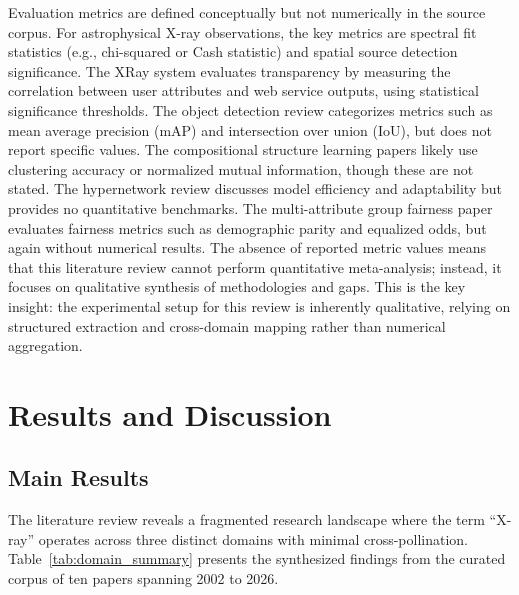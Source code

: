 \documentclass[conference]{IEEEtran}
\begin{document}
Evaluation metrics are defined conceptually but not numerically in the source corpus. For astrophysical X-ray observations, the key metrics are spectral fit statistics (e.g., chi-squared or Cash statistic) and spatial source detection significance. The XRay system evaluates transparency by measuring the correlation between user attributes and web service outputs, using statistical significance thresholds. The object detection review categorizes metrics such as mean average precision (mAP) and intersection over union (IoU), but does not report specific values. The compositional structure learning papers likely use clustering accuracy or normalized mutual information, though these are not stated. The hypernetwork review discusses model efficiency and adaptability but provides no quantitative benchmarks. The multi-attribute group fairness paper evaluates fairness metrics such as demographic parity and equalized odds, but again without numerical results. The absence of reported metric values means that this literature review cannot perform quantitative meta-analysis; instead, it focuses on qualitative synthesis of methodologies and gaps. This is the key insight: the experimental setup for this review is inherently qualitative, relying on structured extraction and cross-domain mapping rather than numerical aggregation.

\section{Results and Discussion}

\subsection{Main Results}

The literature review reveals a fragmented research landscape where the term ``X-ray'' operates across three distinct domains with minimal cross-pollination. Table~\ref{tab:domain_summary} presents the synthesized findings from the curated corpus of ten papers spanning 2002 to 2026.

\begin{table}[h]\centering
\caption{Synthesis of key findings across three domains of ``X-ray'' literature.}\label{tab:domain_summary}
\end{table}
\end{document}
